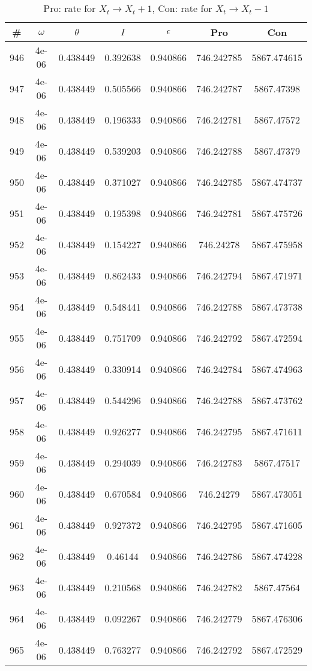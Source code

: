 \newpage
\begin{table}
\caption{Pro: rate for $X_t \rightarrow X_t + 1$, Con: rate for $X_t \rightarrow X_t - 1$}
\begin{tabular*}{\linewidth}{c|c|c|c|c|c|c}
\# & $\omega$ & $\theta$ & $I$ & $\epsilon$ & Pro & Con \\
\hline
946 & 4e-06 & 0.438449 & 0.392638 & 0.940866 & 746.242785 & 5867.474615\\
947 & 4e-06 & 0.438449 & 0.505566 & 0.940866 & 746.242787 & 5867.47398\\
948 & 4e-06 & 0.438449 & 0.196333 & 0.940866 & 746.242781 & 5867.47572\\
949 & 4e-06 & 0.438449 & 0.539203 & 0.940866 & 746.242788 & 5867.47379\\
950 & 4e-06 & 0.438449 & 0.371027 & 0.940866 & 746.242785 & 5867.474737\\
951 & 4e-06 & 0.438449 & 0.195398 & 0.940866 & 746.242781 & 5867.475726\\
952 & 4e-06 & 0.438449 & 0.154227 & 0.940866 & 746.24278 & 5867.475958\\
953 & 4e-06 & 0.438449 & 0.862433 & 0.940866 & 746.242794 & 5867.471971\\
954 & 4e-06 & 0.438449 & 0.548441 & 0.940866 & 746.242788 & 5867.473738\\
955 & 4e-06 & 0.438449 & 0.751709 & 0.940866 & 746.242792 & 5867.472594\\
956 & 4e-06 & 0.438449 & 0.330914 & 0.940866 & 746.242784 & 5867.474963\\
957 & 4e-06 & 0.438449 & 0.544296 & 0.940866 & 746.242788 & 5867.473762\\
958 & 4e-06 & 0.438449 & 0.926277 & 0.940866 & 746.242795 & 5867.471611\\
959 & 4e-06 & 0.438449 & 0.294039 & 0.940866 & 746.242783 & 5867.47517\\
960 & 4e-06 & 0.438449 & 0.670584 & 0.940866 & 746.24279 & 5867.473051\\
961 & 4e-06 & 0.438449 & 0.927372 & 0.940866 & 746.242795 & 5867.471605\\
962 & 4e-06 & 0.438449 & 0.46144 & 0.940866 & 746.242786 & 5867.474228\\
963 & 4e-06 & 0.438449 & 0.210568 & 0.940866 & 746.242782 & 5867.47564\\
964 & 4e-06 & 0.438449 & 0.092267 & 0.940866 & 746.242779 & 5867.476306\\
965 & 4e-06 & 0.438449 & 0.763277 & 0.940866 & 746.242792 & 5867.472529\\

\end{tabular*}
\end{table}
